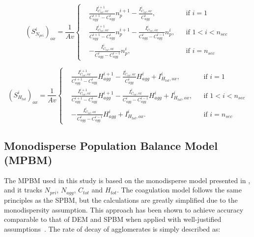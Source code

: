\begin{equation}
	\left(S^i_{N_{pri}}\right)_{ox}=
	\frac{1}{Av}
	\left\{
	\begin{aligned}
		&\frac{I^{i+1}_{C_{tot},ox}}{C^{i+1}_{agg}-C^{i}_{agg}}n^{i+1}_p
		-
		\frac{I^{i}_{C_{tot},ox}}{C^{i}_{agg}},
		&&
		\text{if } i = 1
		\\
		&\frac{I^{i+1}_{C_{tot},ox}}{C^{i+1}_{agg}-C^{i}_{agg}}n^{i+1}_p
		-
		\frac{I^{i}_{C_{tot},ox}}{C^{i}_{agg}-C^{i-1}_{agg}}n^{i}_p,
		&&
		\text{if } 1 < i < n_{sec}
		\\
		&
		-
		\frac{I^{i}_{C_{tot},ox}}{C^{i}_{agg}-C^{i-1}_{agg}}n^{i}_p,
		&&\text{if } i=n_{sec}
	\end{aligned}
	\right.
	\label{eqn:S_Npri_oxsect}
\end{equation}

\begin{equation}
	\left(S^i_{H_{tot}}\right)_{ox}=
	\frac{1}{Av}
	\left\{
	\begin{aligned}
		&\frac{I^{i+1}_{C_{tot},ox}}{C^{i+1}_{agg}-C^{i}_{agg}}H^{i+1}_{agg}
		-
		\frac{I^{i}_{C_{tot},ox}}{C^{i}_{agg}}H^{i}_{agg}
		+ I^{i}_{H_{tot}, ox},
		&&
		\text{if } i = 1
		\\
		&\frac{I^{i+1}_{C_{tot},ox}}{C^{i+1}_{agg}-C^{i}_{agg}}H^{i+1}_{agg}
		-
		\frac{I^{i}_{C_{tot},ox}}{C^{i}_{agg}-C^{i-1}_{agg}}H^{i}_{agg}
		+ I^{i}_{H_{tot}, ox},
		&&
		\text{if } 1 < i < n_{sec}
		\\
		&
		-
		\frac{I^{i}_{C_{tot},ox}}{C^{i}_{agg}-C^{i-1}_{agg}}H^{i}_{agg}
		+ I^{i}_{H_{tot}, ox}.
		&&\text{if } i=n_{sec}
	\end{aligned}
	\right.
	\label{eqn:S_Htot_oxsect}
\end{equation}


\subsection{Monodisperse Population Balance Model (MPBM)}
\label{sec:mpbm}
The MPBM used in this study is based on the monodisperse model presented in \citep{kholghy2021surface}, and it tracks $N_{pri}$, $N_{agg}$, $C_{tot}$ and $H_{tot}$. The coagulation model follows the same principles as the SPBM, but the calculations are greatly simplified due to the monodispersity assumption. This approach has been shown to achieve accuracy comparable to that of DEM and SPBM when applied with well-justified assumptions~\citep{Kelesidis2017Flame, kelesidis2019estimating}. The rate of decay of agglomerates is simply described as:

